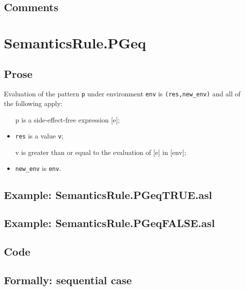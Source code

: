 \documentclass{book}
\begin{document}
    \subsection{Comments}

\section{SemanticsRule.PGeq \label{sec:SemanticsRule.PGeq}}

    \subsection{Prose}
   Evaluation of the pattern \texttt{p} under environment \texttt{env} is
  \texttt{(res,new\_env)} and all of the following apply:
    \begin{itemize}
    \item [p] is a side-effect-free expression [e];
    \item \texttt{res} is a value \texttt{v};
    \item [v] is greater than or equal to the evaluation of [e] in [env];
    \item \texttt{new\_env} is \texttt{env}.
    \end{itemize}

    \subsection{Example: SemanticsRule.PGeqTRUE.asl}

    \subsection{Example: SemanticsRule.PGeqFALSE.asl}

  \subsection{Code}

  \subsection{Formally: sequential case}
  \begin{align}
  \end{align} 
\end{document}
